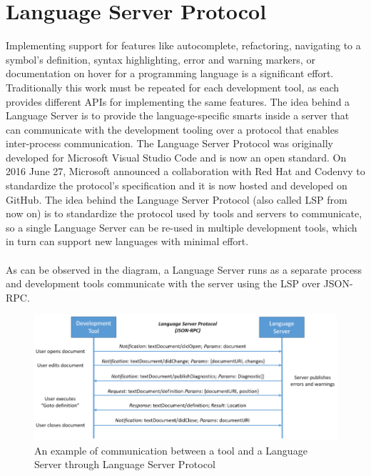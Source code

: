 \chapter{Language Server Protocol}\label{chapter:language-server-protocol}
Implementing support for features like autocomplete, refactoring, navigating to a symbol's definition, syntax highlighting, error and warning markers, or documentation on hover for a programming language is a significant effort. Traditionally this work must be repeated for each development tool, as each provides different APIs for implementing the same features.
The idea behind a Language Server is to provide the language-specific smarts inside a server that can communicate with the development tooling over a protocol that enables inter-process communication.
The Language Server Protocol was originally developed for Microsoft Visual Studio Code and is now an open standard. On 2016 June 27, Microsoft announced a collaboration with Red Hat and Codenvy to standardize the protocol's specification and it is now hosted and developed on GitHub.
The idea behind the Language Server Protocol (also called LSP from now on) is to standardize the protocol used by tools and servers to communicate, so a single Language Server can be re-used in multiple development tools, which in turn can support new languages with minimal effort.
\\\\
As can be observed in the diagram, a Language Server runs as a separate process and development tools communicate with the server using the LSP over JSON-RPC.

\begin{figure}[ht]
	\centering
	\includegraphics[width=1\textwidth]{Immagini/language-server-sequence.jpg}
	\caption{An example of communication between a tool and a Language Server through Language Server Protocol \cite{LanguageServerProtocolWebsite}}
	\label{fig:language-server-sequence}
\end{figure}

